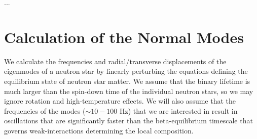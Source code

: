 \documentclass[fleqn,usenatbib]{mnras}
\begin{document}
...









\section{Calculation of the Normal Modes}
\hspace{\parindent}We calculate the frequencies and radial/transverse displacements of the eigenmodes of a neutron star by linearly perturbing the equations defining the equilibrium state of neutron star matter. We assume that the binary lifetime is much larger than the spin-down time of the individual neutron stars, so we may ignore rotation and high-temperature effects. We will also assume that the frequencies of the modes ($\sim 10 - 100$ Hz) that we are interested in result in oscillations that are significantly faster than the beta-equilibrium timescale that governs weak-interactions determining the local composition. 





\end{document}
